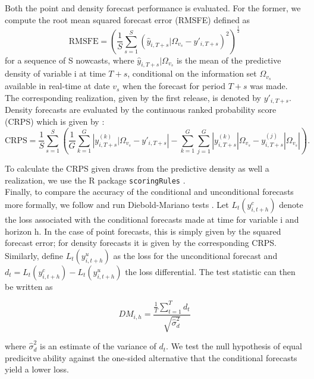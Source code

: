 \documentclass[notitlepage,a4paper,12pt]{article}
\begin{document}
Both the point and density forecast performance is evaluated. For the former, we compute the root mean squared forecast error (RMSFE) defined as
\begin{equation*}
\text{RMSFE} = \left( \frac{1}{S} \sum_{s=1}^S (\hat{y}_{i, T+s}|\Omega_{v_{s}} - y'_{i, T+s})^2 \right) ^{\frac{1}{2}}
\end{equation*}
for a sequence of S nowcasts, where $\hat{y}_{i, T+s}|\Omega_{v_{s}}$ is the mean of the predictive density of variable i at time $T+s$, conditional on the information set $\Omega_{v_s}$ available in real-time at date $v_s$ when the forecast for period $T+s$ was made. The corresponding realization, given by the first release, is denoted by $y'_{i,T+s}$. Density forecasts are evaluated by the continuous ranked probability score (CRPS) which is given by \citep[see][]{Gneitingetal2016}:
\begin{equation*}
\text{CRPS} = \frac{1}{S} \sum_{s=1}^{S} \left( \frac{1}{G} \sum_{k=1}^G \left\lvert {y}^{(k)}_{i,T+s}|\Omega_{v_{s}} - y'_{i, T+s} \right\rvert - \sum_{k=1}^G \sum_{j=1}^G \left\lvert {y}^{(k)}_{i,T+s}|\Omega_{v_{s}} - {y}^{(j)}_{i,T+s}|\Omega_{v_{s}} \right\rvert \right).
\end{equation*}

To calculate the CRPS given draws from the predictive density as well a realization, we use the R package \texttt{scoringRules} \citep{jkl_2019_jss}.\\

Finally, to compare the accuracy of the conditional and unconditional forecasts more formally, we follow \citet{ganicsodendahl_2021_ijf} and run Diebold-Mariano tests \citep{dm_1995_jbes}. Let $L_t(y^c_{i, t+h})$ denote the loss associated with the conditional forecasts made at time for variable i and horizon h. In the case of point forecasts, this is simply given by the squared forecast error; for density forecasts it is given by the corresponding CRPS. Similarly, define $L_t(y^u_{i, t+h})$ as the loss for the unconditional forecast and $d_t = L_t(y^c_{i, t+h}) - L_t(y^u_{i, t+h})$ the loss differential. The test statistic can then be written as 

$$
    DM_{i, h} = \frac{\frac{1}{T} \sum_{t=1}^{T} d_t}{\sqrt{\hat{\sigma}^2_d}}
$$

where $\hat{\sigma}^2_d$ is an estimate of the variance of $d_t$. We test the null hypothesis of equal predicitve ability against the one-sided alternative that the conditional forecasts yield a lower loss. 
\end{document}
